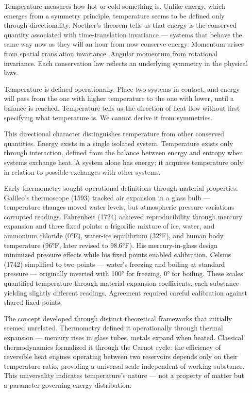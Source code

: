 Temperature measures how hot or cold something is. Unlike energy, which emerges from a symmetry principle, temperature seems to be defined only through directionality. Noether's theorem tells us that energy is the conserved quantity associated with time-translation invariance — systems that behave the same way now as they will an hour from now conserve energy. Momentum arises from spatial translation invariance. Angular momentum from rotational invariance. Each conservation law reflects an underlying symmetry in the physical laws.

Temperature is defined operationally. Place two systems in contact, and energy will pass from the one with higher temperature to the one with lower, until a balance is reached. Temperature tells us the direction of heat flow without first specifying what temperature is. We cannot derive it from symmetries. 

This directional character distinguishes temperature from other conserved quantities. Energy exists in a single isolated system. Temperature exists only through interaction, defined from the balance between energy and entropy when systems exchange heat. A system alone has energy; it acquires temperature only in relation to possible exchanges with other systems.

Early thermometry sought operational definitions through material properties. Galileo's thermoscope (1593) tracked air expansion in a glass bulb — temperature changes moved water levels, but atmospheric pressure variations corrupted readings. Fahrenheit (1724) achieved reproducibility through mercury expansion and three fixed points: a frigorific mixture of ice, water, and ammonium chloride (0°F), water-ice equilibrium (32°F), and human body temperature (96°F, later revised to 98.6°F). His mercury-in-glass design minimized pressure effects while his fixed points enabled calibration. Celsius (1742) simplified to two points — water's freezing and boiling at standard pressure — originally inverted with 100° for freezing, 0° for boiling. These scales quantified temperature through material expansion coefficients, each substance yielding slightly different readings. Agreement required careful calibration against shared fixed points.

The concept developed through distinct theoretical frameworks that initially seemed unrelated. Thermometry defined it operationally through thermal expansion — mercury rises in glass tubes, metals expand when heated. Classical thermodynamics formalized it through the Carnot cycle: the efficiency of reversible heat engines operating between two reservoirs depends only on their temperature ratio, providing a universal scale independent of working substance. This universality indicates temperature's nature — not a property of matter but a parameter governing energy distribution.

